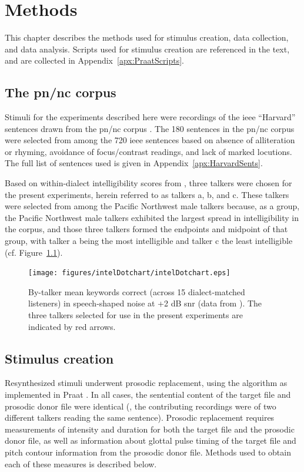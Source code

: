 \chapter{Methods\label{chap:Methods}}

This chapter describes the methods used for stimulus creation, data collection, and data analysis.  Scripts used for stimulus creation are referenced in the text, and are collected in Appendix~\ref{apx:PraatScripts}.%

\section{The \ac{pn/nc} corpus}
Stimuli for the experiments described here were recordings of the \ac{ieee} “Harvard” sentences \citep{HarvardSents} drawn from the \ac{pn/nc} corpus \citep{xxx}.  The 180 sentences in the \ac{pn/nc} corpus were selected from among the 720 \ac{ieee} sentences based on absence of alliteration or rhyming, avoidance of focus/contrast readings, and lack of marked locutions.  The full list of sentences used is given in Appendix~\ref{apx:HarvardSents}.  

Based on within-dialect intelligibility scores from \citet{McCloyEtAl2013}, three talkers were chosen for the present experiments, herein referred to as talkers \ac{a}, \ac{b}, and \ac{c}.  These talkers were selected from among the Pacific Northwest male talkers because, as a group, the Pacific Northwest male talkers exhibited the largest spread in intelligibility in the corpus, and those three talkers formed the endpoints and midpoint of that group, with talker \ac{a} being the most intelligible and talker \ac{c} the least intelligible (cf. Figure~\ref{fig:dotchart}).

\begin{figure}
	\begin{centering}
	\texttt{[image: figures/intelDotchart/intelDotchart.eps]}
	\caption[Intelligibility of talkers used to make the stimuli]{By-talker mean keywords correct (across 15 dialect-matched listeners) in speech-shaped noise at +2 dB \ac{snr} (data from \citealt{McCloyEtAl2013}).  The three talkers selected for use in the present experiments are indicated by red arrows.\label{fig:dotchart}}
	\end{centering}
\end{figure}

\section{Stimulus creation\label{sec:StimDesign}}
Resynthesized stimuli underwent prosodic replacement, using the \psola{} algorithm as implemented in Praat \citep{praat}.  In all cases, the sentential content of the target file and prosodic donor file were identical (\ie, the contributing recordings were of two different talkers reading the same sentence).  Prosodic replacement requires measurements of intensity and duration for both the target file and the prosodic donor file, as well as information about glottal pulse timing of the target file and pitch contour information from the prosodic donor file.  Methods used to obtain each of these measures is described below.

